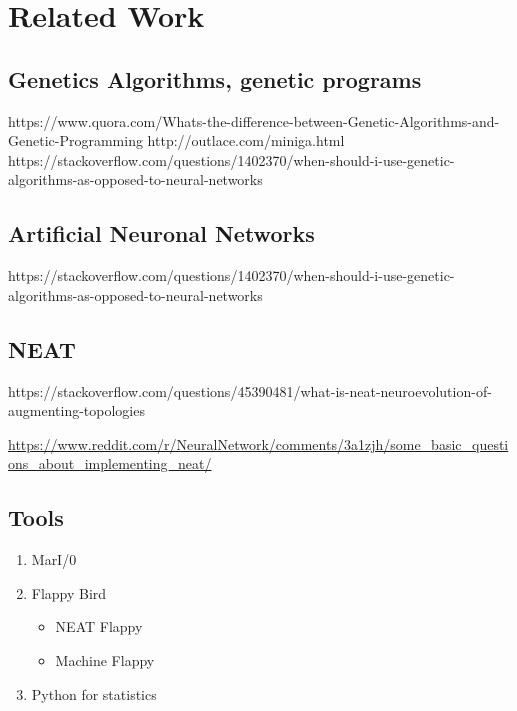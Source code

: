 %
\chapter{Related Work}
\label{sec:related}


\section{Genetics Algorithms, genetic programs}
\label{sec:related:genetic}

https://www.quora.com/Whats-the-difference-between-Genetic-Algorithms-and-Genetic-Programming
http://outlace.com/miniga.html
https://stackoverflow.com/questions/1402370/when-should-i-use-genetic-algorithms-as-opposed-to-neural-networks

\section{Artificial Neuronal Networks}
\label{sec:related:nn}

https://stackoverflow.com/questions/1402370/when-should-i-use-genetic-algorithms-as-opposed-to-neural-networks

\section{NEAT}
\label{sec:related:neat}

https://stackoverflow.com/questions/45390481/what-is-neat-neuroevolution-of-augmenting-topologies

\url{https://www.reddit.com/r/NeuralNetwork/comments/3a1zjh/some_basic_questions_about_implementing_neat/}

\section{Tools}
\label{sec:related:tools}

\begin{enumerate}
	\item MarI/0
	\item Flappy Bird
	\begin{itemize}
		\item NEAT Flappy
		\item Machine Flappy
	\end{itemize}
	\item Python for statistics
\end{enumerate}

